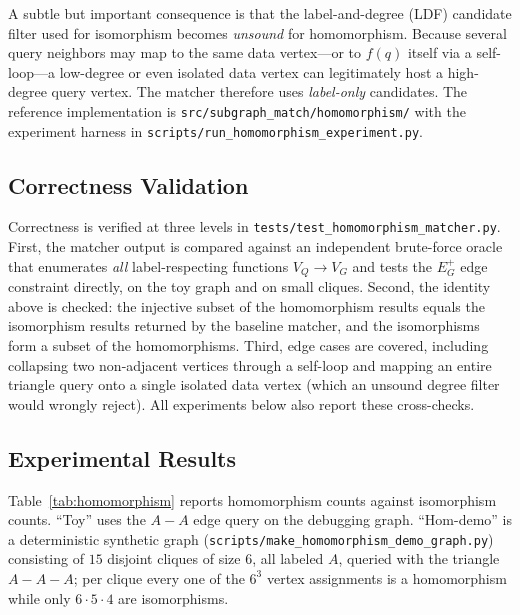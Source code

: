 A subtle but important consequence is that the label-and-degree (LDF) candidate filter used for isomorphism becomes \emph{unsound} for homomorphism. Because several query neighbors may map to the same data vertex---or to $f(q)$ itself via a self-loop---a low-degree or even isolated data vertex can legitimately host a high-degree query vertex. The matcher therefore uses \emph{label-only} candidates. The reference implementation is \texttt{src/subgraph\_match/homomorphism/} with the experiment harness in \texttt{scripts/run\_homomorphism\_experiment.py}.

\subsection{Correctness Validation}

Correctness is verified at three levels in \texttt{tests/test\_homomorphism\_matcher.py}. First, the matcher output is compared against an independent brute-force oracle that enumerates \emph{all} label-respecting functions $V_Q \rightarrow V_G$ and tests the $E_G^+$ edge constraint directly, on the toy graph and on small cliques. Second, the identity above is checked: the injective subset of the homomorphism results equals the isomorphism results returned by the baseline matcher, and the isomorphisms form a subset of the homomorphisms. Third, edge cases are covered, including collapsing two non-adjacent vertices through a self-loop and mapping an entire triangle query onto a single isolated data vertex (which an unsound degree filter would wrongly reject). All experiments below also report these cross-checks.

\subsection{Experimental Results}

Table~\ref{tab:homomorphism} reports homomorphism counts against isomorphism counts. ``Toy'' uses the $A\!-\!A$ edge query on the debugging graph. ``Hom-demo'' is a deterministic synthetic graph (\texttt{scripts/make\_homomorphism\_demo\_graph.py}) consisting of $15$ disjoint cliques of size $6$, all labeled $A$, queried with the triangle $A\!-\!A\!-\!A$; per clique every one of the $6^3$ vertex assignments is a homomorphism while only $6\cdot 5\cdot 4$ are isomorphisms.

